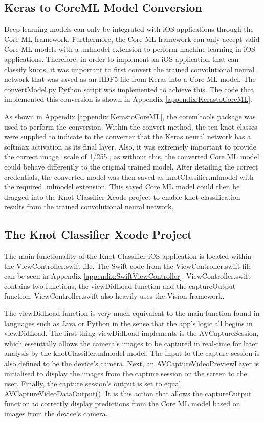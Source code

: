 \documentclass{l4proj}
\begin{document}
\subsection{Keras to CoreML Model Conversion}
Deep learning models can only be integrated with iOS applications through the Core ML framework.
Furthermore, the Core ML framework can only accept valid Core ML models with a .mlmodel extension to perform machine learning in iOS applications. 
Therefore, in order to implement an iOS application that can classify knots, it was important to first convert the trained convolutional neural network that was saved as an HDF5 file from Keras into a Core ML model.
The convertModel.py Python script was implemented to achieve this.
The code that implemented this conversion is shown in Appendix \ref{appendix:KerastoCoreML}.

As shown in Appendix \ref{appendix:KerastoCoreML}, the coremltools package was used to perform the conversion.
Within the convert method, the ten knot classes were supplied to indicate to the converter that the Keras neural network has a softmax activation as its final layer.
Also, it was extremely important to provide the correct image\_scale of 1/255., as without this, the converted Core ML model could behave differently to the original trained model.
After detailing the correct credentials, the converted model was then saved as knotClassifier.mlmodel with the required .mlmodel extension.
This saved Core ML model could then be dragged into the Knot Classifier Xcode project to enable knot classification results from the trained convolutional neural network.

\subsection{The Knot Classifier Xcode Project}
The main functionality of the Knot Classifier iOS application is located within the ViewController.swift file.
The Swift code from the ViewController.swift file can be seen in Appendix \ref{appendix:SwiftViewController}.
ViewController.swift contains two functions, the viewDidLoad function and the captureOutput function.
ViewController.swift also heavily uses the Vision framework.

The viewDidLoad function is very much equivalent to the main function found in languages such as Java or Python in the sense that the app's logic all begins in viewDidLoad.
The first thing viewDidLoad implements is the AVCaptureSession, which essentially allows the camera's images to be captured in real-time for later analysis by the knotClassifier.mlmodel model.
The input to the capture session is also defined to be the device's camera.
Next, an AVCaptureVideoPreviewLayer is initialised to display the images from the capture session on the screen to the user.
Finally, the capture session's output is set to equal AVCaptureVideoDataOutput().
It is this action that allows the captureOutput function to correctly display predictions from the Core ML model based on images from the device's camera.
\end{document}
